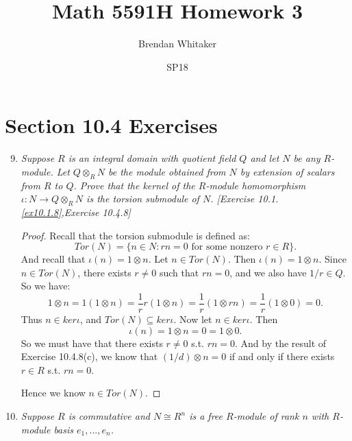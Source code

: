 \documentclass[10pt,oneside,reqno]{amsart}
\theoremstyle{plain}
\theoremstyle{definition}
\theoremstyle{remark}
\newcommand{\sub}{\subseteq}
\newcommand{\fracc}{\frac}
\newcommand{\tens}{\otimes}
\begin{document}
\title{Math 5591H Homework 3}

\date{SP18}

\author[Brendan Whitaker]{Brendan Whitaker}

\maketitle



\section*{Section 10.4 Exercises}



\begin{enumerate}[label=\arabic*.]
\setcounter{enumi}{8}
\item \textit{Suppose $R$ is an integral domain with quotient field $Q$ and let $N$ be any $R$-module. Let $Q \tens_R N$ be the module obtained from $N$ by extension of scalars from $R$ to $Q$. Prove that the kernel of the $R$-module homomorphism $\iota: N \to Q \tens_R N$ is the torsion submodule of $N$. [Exercise 10.1.\ref{ex10.1.8},Exercise 10.4.8]}

\begin{proof}
Recall that the torsion submodule is defined as: 
$$
Tor(N) = \{n \in N:rn = 0 \text{ for some nonzero } r \in R\}. 
$$
And recall that $\iota(n) = 1 \tens n$. Let $n \in Tor(N)$. Then $\iota(n) = 1 \tens n$. Since $n \in Tor(N)$, there exists $r \neq 0$ such that $rn = 0$, and we also have $1/r \in Q$. So we have: 
$$
1 \tens n = 1(1 \tens n) = \fracc{1}{r}r(1 \tens n) = \frac{1}{r}(1 \tens rn) = \fracc{1}{r}(1 \tens 0) = 0.
$$
Thus $n \in ker\iota$, and $Tor(N) \sub ker \iota$. Now let $n \in ker\iota$. Then
$$
\iota(n) = 1 \tens n = 0 = 1 \tens 0. 
$$ 
So we must have that there exists $r \neq 0$ s.t. $rn = 0$. And by the result of Exercise 10.4.8(c), we know that $(1/d) \tens n = 0$ if and only if there exists $r \in R$ s.t. $rn = 0$. 
\begin{comment} Then we would have:
$$
1 \tens n = \fracc{1}{r}r \tens n = \fracc{1}{r}\tens rn = \fracc{1}{r}\tens 0 = 0 = 1 \tens 0.
$$
\end{comment}
Hence we know $n \in Tor(N)$. 
\end{proof}

\item \textit{Suppose $R$ is commutative and $N \cong R^n$ is a free $R$-module of rank $n$ with $R$-module basis $e_1,...,e_n$. }


\end{enumerate}
\end{document}
